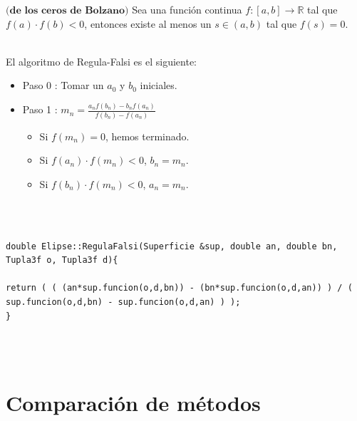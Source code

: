 \begin{teorema}\label{teo:bolzano}
	$\textbf{(de los ceros de Bolzano)}$ Sea una función continua $f : [a,b] \to \mathbb{R}$ tal que $f(a) \cdot f(b) < 0$, entonces existe al menos un $s \in (a,b)$ tal que $f(s) = 0$.
\end{teorema}
${ }$\\



El algoritmo de Regula-Falsi es el siguiente:

\begin{itemize}
	\item Paso 0 : Tomar un $a_0$ y $b_0$ iniciales.
	\item Paso 1 : $m_n = \frac{a_n f(b_n) - b_n f(a_n)}{f(b_n) - f(a_n)}$
	\begin{itemize}
		\item Si $f(m_n)=0$, hemos terminado.
		\item Si $f(a_n) \cdot f(m_n) < 0$, $b_n = m_n$.
		\item Si $f(b_n) \cdot f(m_n) < 0$, $a_n = m_n$.
	\end{itemize}
\end{itemize}
${ }$\\

\begin{lstlisting}[style=Consola]

double Elipse::RegulaFalsi(Superficie &sup, double an, double bn, Tupla3f o, Tupla3f d){

return ( ( (an*sup.funcion(o,d,bn)) - (bn*sup.funcion(o,d,an)) ) / ( sup.funcion(o,d,bn) - sup.funcion(o,d,an) ) );
}

\end{lstlisting}
${ }$\\




${ }$\\
\section{Comparación de métodos}
${ }$\\



